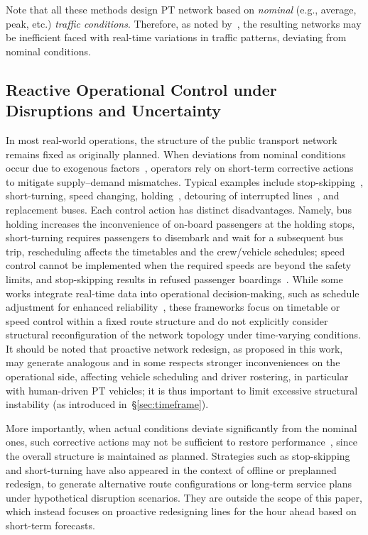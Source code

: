 \documentclass[a4paper,fleqn]{cas-sc}
\begin{document}
Note that all these methods design PT network based on \emph{nominal} (e.g., average, peak, etc.) \emph{traffic conditions}.
Therefore, as noted by~\citep{tan2024optimizing}, the resulting networks may be inefficient faced with real-time variations in traffic patterns, deviating from nominal conditions. 

\subsection{Reactive Operational Control under Disruptions and Uncertainty}
\label{sec:reactive}

In most real-world operations, the structure of the public transport network remains fixed as originally planned. 
When deviations from nominal conditions occur due to exogenous factors~\citep{nissen2020does, chen2009analyzing}, 
operators rely on short-term corrective actions to mitigate supply--demand mismatches.
Typical examples include stop-skipping~\citep{peled2021quality}, short-turning, 
speed changing, holding~\citep{tang2018optimal, manasra2019optimization, gkiotsalitis2020public, olvera2023holding}, 
detouring of interrupted lines~\citep{zheng2023multi}, and replacement buses.
Each control action has distinct disadvantages.
Namely, bus holding increases the inconvenience of on-board passengers at the holding stops, short-turning requires passengers to disembark and wait for a subsequent bus trip, rescheduling affects the timetables and the crew/vehicle schedules; speed control cannot be implemented when the required speeds are beyond the safety limits, and stop-skipping results in refused passenger boardings~\citep{gkiotsalitis2021stop}.
While some works integrate real-time data into operational decision-making, such as schedule adjustment for enhanced reliability~\citep{cao2019real}, these frameworks focus on timetable or speed control within a fixed route structure and do not explicitly consider structural reconfiguration of the network topology under time-varying conditions.
It should be noted that proactive network redesign, as proposed in this work, may generate analogous and in some respects stronger inconveniences on the operational side, affecting vehicle scheduling and driver rostering, in particular with human-driven PT vehicles; it is thus important to limit excessive structural instability (as introduced in~\S{}\ref{sec:timeframe}).

More importantly, when actual conditions deviate significantly from the nominal ones, such corrective actions may not be sufficient to restore performance~\citep{guo2024restoring}, since the overall structure is maintained as planned.
%
Strategies such as stop-skipping and short-turning have also appeared in the context of offline or preplanned redesign, to generate alternative route configurations or long-term service plans under hypothetical disruption scenarios. They are outside the scope of this paper, which instead focuses on proactive redesigning lines for the hour ahead based on short-term forecasts.
\end{document}
